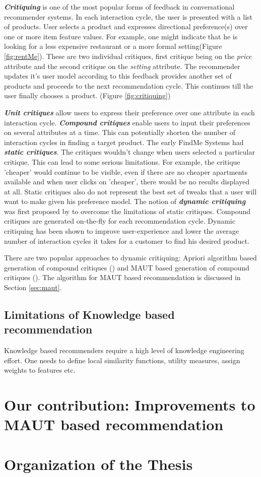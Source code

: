 \textit{\textbf{Critiquing}} is one of the most popular forms of feedback in conversational recommender systems. In each interaction cycle, the user is presented with a list of products.
User selects a product and expresses directional preference(s) over one or more item feature values. 
For example, one might indicate that he is looking for a less expensive restaurant or a more formal setting(Figure \ref{fig:rentMe}). These are two individual critiques, first critique being on the \textit{price} attribute and the second critique on the \textit{setting} attribute. 
The recommender updates it's user model according to this feedback provides another set of products and proceeds to the next recommendation cycle. This continues till the user finally chooses a product. (Figure \ref{fig:critiquing})

\textit{\textbf{Unit critiques}} allow users to express their preference over one attribute in each interaction cycle. \textit{\textbf{Compound critiques}} enable users to input their preferences on several attributes at a time. This can potentially shorten the number of interaction cycles in finding a target product.
The early FindMe Systems \cite{burkeEarlierSystems} had \textit{\textbf{static critiques}}. The critiques wouldn't change when users selected a particular critique. 
This can lead to some serious limitations.
For example, the critique 'cheaper' would continue to be visible, even if there are no cheaper apartments available and when user clicks on 'cheaper', there would be no results displayed at all.
Static critiques also do not represent the best set of tweaks that a user will want to make given his preference model.
The notion of \textit{\textbf{dynamic critiquing}} was first proposed by \cite{mccarthy2004dynamic} to overcome the limitations of static critiques.
Compound critiques are generated on-the-fly for each recommendation cycle. Dynamic critiquing has been shown to improve user-experience and lower the average number of interaction cycles it takes for a customer to find his desired product.

There are two popular approaches to dynamic critiquing: Apriori algorithm based generation of compound critiques (\cite{mccarthy2004dynamic}) and MAUT based generation of compound critiques (\cite{mautPaper}). 
The algorithm for MAUT based recommendation is discussed in Section \ref{sec:maut}.

\subsection{Limitations of Knowledge based recommendation}
Knowledge based recommenders require a high level of knowledge engineering effort.
One needs to define local similarity functions, utility measures, assign weights to features etc.

\section{Our contribution: Improvements to MAUT based recommendation}
\section{Organization of the Thesis}
